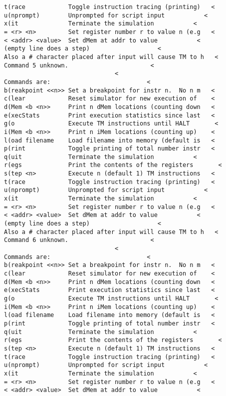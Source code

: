 \documentclass[12pt]{book}
\begin{document}
\begin{lstlisting}
t(race            Toggle instruction tracing (printing)   <
u(nprompt)        Unprompted for script input           <
x(it              Terminate the simulation           <
= <r> <n>         Set register number r to value n (e.g   <
< <addr> <value>  Set dMem at addr to value           <
(empty line does a step)                   <
Also a # character placed after input will cause TM to h   <
Command 5 unknown.                       <
                               <
Commands are:                           <
b(reakpoint <<n>> Set a breakpoint for instr n.  No n m   <
c(lear            Reset simulator for new execution of    <
d(Mem <b <n>>     Print n dMem locations (counting down   <
e(xecStats        Print execution statistics since last   <
g(o               Execute TM instructions until HALT       <
i(Mem <b <n>>     Print n iMem locations (counting up)    <
l(oad filename    Load filename into memory (default is   <
p(rint            Toggle printing of total number instr   <
q(uit             Terminate the simulation           <
r(egs             Print the contents of the registers       <
s(tep <n>         Execute n (default 1) TM instructions   <
t(race            Toggle instruction tracing (printing)   <
u(nprompt)        Unprompted for script input           <
x(it              Terminate the simulation           <
= <r> <n>         Set register number r to value n (e.g   <
< <addr> <value>  Set dMem at addr to value           <
(empty line does a step)                   <
Also a # character placed after input will cause TM to h   <
Command 6 unknown.                       <
                               <
Commands are:                           <
b(reakpoint <<n>> Set a breakpoint for instr n.  No n m   <
c(lear            Reset simulator for new execution of    <
d(Mem <b <n>>     Print n dMem locations (counting down   <
e(xecStats        Print execution statistics since last   <
g(o               Execute TM instructions until HALT       <
i(Mem <b <n>>     Print n iMem locations (counting up)    <
l(oad filename    Load filename into memory (default is   <
p(rint            Toggle printing of total number instr   <
q(uit             Terminate the simulation           <
r(egs             Print the contents of the registers       <
s(tep <n>         Execute n (default 1) TM instructions   <
t(race            Toggle instruction tracing (printing)   <
u(nprompt)        Unprompted for script input           <
x(it              Terminate the simulation           <
= <r> <n>         Set register number r to value n (e.g   <
< <addr> <value>  Set dMem at addr to value           <

\end{lstlisting}
\end{document}
